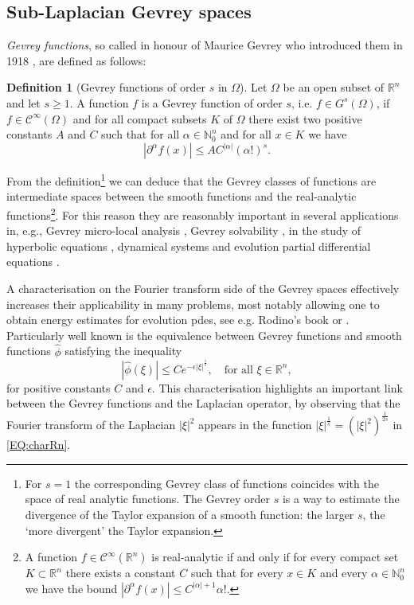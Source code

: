 \documentclass[12pt,oneside,a4paper]{book}
\numberwithin{equation}{section}     %
\theoremstyle{plain}
\theoremstyle{definition}
\newtheorem{definition}[theorem]{Definition}
\newcommand{\N}{{\mathbb N}}
\newcommand{\R}{{\mathbb R}}
\newcommand{\Rn}{{\R}^n}
\begin{document}
\subsection{Sub-Laplacian Gevrey spaces}

\textit{Gevrey functions}, so called in honour of Maurice Gevrey who introduced them  in 1918 \cite{G1918},  are defined as follows:
\begin{definition}[Gevrey functions of order $s$ in $\Omega$]
	Let $\Omega$ be an open subset of $\Rn$ and let $s\geq 1$. A function $f$ is a Gevrey function of order $s$, i.e. $f\in G^s(\Omega)$, if $f\in\mathcal{C}^\infty(\Omega)$ and for all compact subsets $K$ of $\Omega$ there exist two positive constants $A$ and $C$ such that for all $\alpha\in\N^n_0$ and for all $x\in K$ we have
	\[
	|\partial^\alpha f(x)|\leq A C^{|\alpha|}(\alpha!)^s.
	\]
\end{definition}
From the definition\footnote{For $s=1$ the corresponding Gevrey class of functions coincides with the space of real analytic functions. The Gevrey order $s$ is a way to estimate the divergence of the Taylor expansion of a smooth function: the larger $s$, the `more divergent' the Taylor expansion.} we can deduce that the Gevrey classes of functions are intermediate spaces between the smooth functions and the real-analytic functions\footnote{A function $f\in\mathcal{C}^\infty(\Rn)$ is real-analytic if and only if for every compact set $K\subset \Rn$ there exists a constant $C$ such that for every $x\in K$ and every $\alpha\in\N^n_0$ we have the bound $|\partial^\alpha f(x)|\leq C^{|\alpha|+1}\alpha!.$}. For this reason they are reasonably important in several applications in, e.g., Gevrey micro-local analysis \cite{BT1997,MR1997}, Gevrey solvability \cite{CZ1993,MR1997,DFT2009}, in the study of hyperbolic equations \cite{Bronshtein:TMMO-1980,CDS79,M1985}, dynamical systems \cite{G1995, RS1996} and evolution partial differential equations \cite{F1989,KV2011,LMR2000}. 

A characterisation on the Fourier transform side of the Gevrey spaces effectively  increases their applicability in many problems, most notably allowing one to obtain energy estimates for evolution pdes, see e.g. Rodino's book \cite{R1993} or \cite{DFT2009}. Particularly well known is the equivalence between Gevrey functions and smooth functions $\widehat\phi$ satisfying the inequality 
\begin{equation}\label{EQ:charRn}
|\widehat\phi(\xi)|\leq C e^{-\epsilon |\xi|^{\frac{1}{s}}},\quad\text{for all }\xi\in\Rn,
\end{equation}
for positive constants $C$ and $\epsilon$. This characterisation highlights an important link between the Gevrey functions and the Laplacian operator, by observing that the Fourier transform of the Laplacian $|\xi|^2$ appears in the function $ |\xi|^{\frac{1}{s}}=(|\xi|^2)^{\frac{1}{2s}}$ in \eqref{EQ:charRn}.
\end{document}
